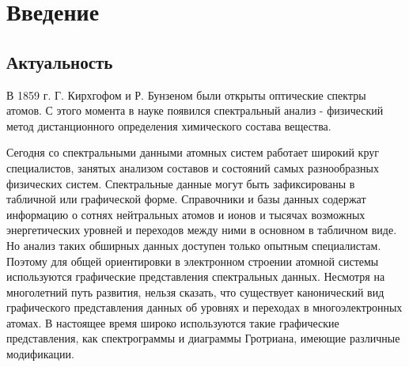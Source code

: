\documentclass[a4paper, 12pt]{article}
\let\stdsection\section
\renewcommand\section{\newpage\stdsection}
\begin{document}

\newpage

\tableofcontents
\newpage

\section*{Введение}
\subsection*{Актуальность}
    
    В 1859 г. Г. Кирхгофом и Р. Бунзеном были открыты оптические спектры атомов. С этого момента в науке появился спектральный анализ - физический метод дистанционного определения химического состава вещества.\par
    Сегодня со спектральными данными атомных систем работает широкий круг специалистов, занятых анализом составов и состояний самых разнообразных физических систем. Спектральные данные могут быть зафиксированы в табличной или графической форме. Справочники и базы данных содержат информацию о сотнях нейтральных атомов и ионов и тысячах возможных энергетических уровней и переходов между ними в основном в табличном виде. Но анализ таких обширных данных доступен только опытным специалистам. Поэтому для общей ориентировки в электронном строении атомной системы используются графические представления спектральных данных. Несмотря на многолетний путь развития, нельзя сказать, что существует канонический вид графического представления данных об уровнях и переходах в многоэлектронных атомах. В настоящее время широко используются такие графические представления, как спектрограммы и диаграммы Гротриана, имеющие различные модификации.\par
    \iffalse
        В экологии атомная спектроскопия используется для мониторинга состояния окружающей среды посредством анализа загрязняющих соединений. В геологии исследуется химический состав руд и минералов для контроля качества в процессе обогащения, а также изучается метеоритный материал для определения состава космических объектов. В металлургии атомная спектроскопия также является мощным инструментом при сортировке и анализе металлического лома, ведении плавки и получении новых материалов. Также спектральные данные атомных систем необходимы при исследованиях в области астрофизики, управляемого термоядерного синтеза и других отраслях науки и техники.
        \par
        Спектральные данные могут быть зафиксированы в табличной или графической форме. Справочники и базы данных содержат информацию о переходах и энергетических уровнях атомов и ионов в основном в табличном виде. Но анализ таких обширных данных доступен только опытным специалистам. Поэтому для общей ориентировки в электронном строении атомной системы используются графические представления спектральных данных. Качественное представление таких данных обеспечивает более эффективные механизмы исследования спектров, дает информацию об электронном строении атома в наглядной форме, удобной для обработки и размышления, а также нередко позволяет увидеть зависимости и закономерности, скрытые в численных значениях спектральных параметров.  \fi\par
    
\end{document}

